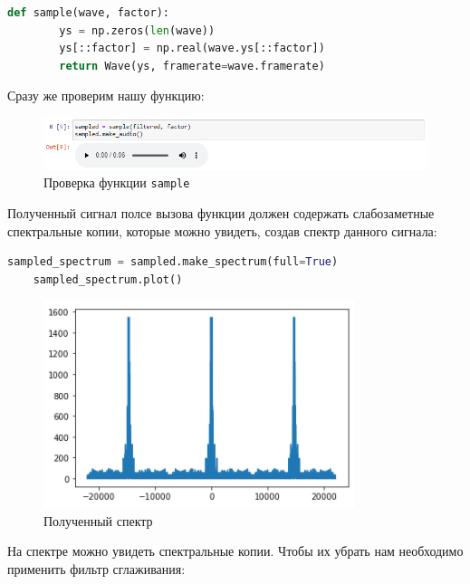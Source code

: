 \documentclass[a4paper]{article}
\begin{document}
\begin{lstlisting}[language=Python, caption= Функция \texttt{sample}]
    def sample(wave, factor):
        ys = np.zeros(len(wave))
        ys[::factor] = np.real(wave.ys[::factor])
        return Wave(ys, framerate=wave.framerate)
\end{lstlisting}
            
            Сразу же проверим нашу функцию:
            
            \begin{figure}[H]
                \centering
                \includegraphics[width=\textwidth]{ex_3_5.png}
                \caption{Проверка функции \texttt{sample}}
                \label{fig:ex_3_5}
            \end{figure}
            
            Полученный сигнал полсе вызова функции должен содержать слабозаметные спектральные копии, которые можно увидеть, создав спектр данного сигнала:
            
\begin{lstlisting}[language=Python, caption= Создание спектра сигнала]
    sampled_spectrum = sampled.make_spectrum(full=True)
    sampled_spectrum.plot()
\end{lstlisting}
            
            \begin{figure}[H]
                \centering
                \includegraphics{ex_3_6.png}
                \caption{Полученный спектр}
                \label{fig:ex_3_6}
            \end{figure}
            
            На спектре можно увидеть спектральные копии. Чтобы их убрать нам необходимо применить фильтр сглаживания:
            
\end{document}
